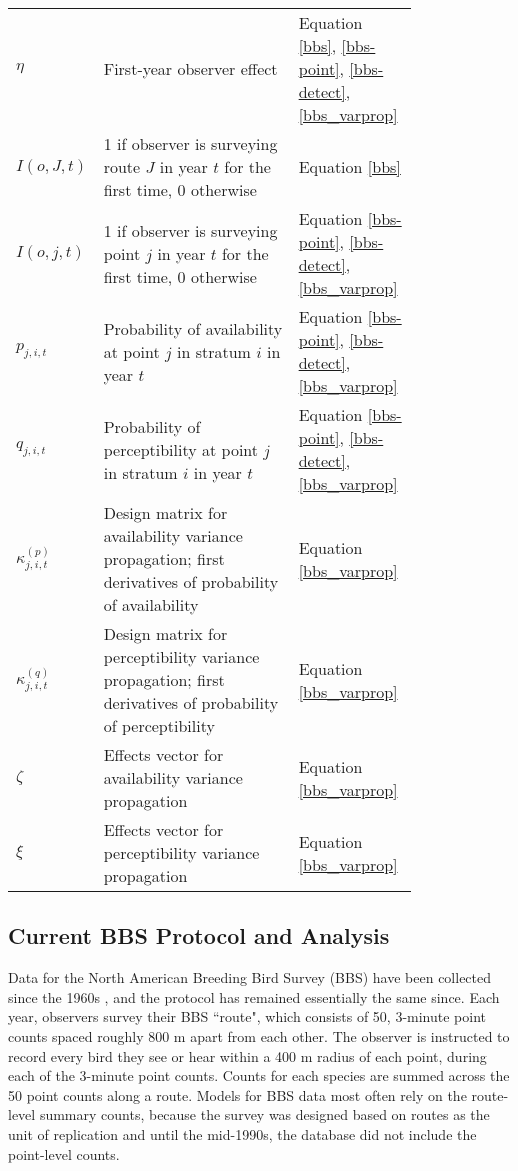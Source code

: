 \documentclass[12pt]{article}
\begin{document}
\begin{table}[!ht]
\begin{tabular}[t]{l>{\raggedright}p{0.5\linewidth}>{\raggedright\arraybackslash}p{0.3\linewidth}}
		$\eta$&First-year observer effect&Equation \ref{bbs}, \ref{bbs-point}, \ref{bbs-detect}, \ref{bbs_varprop}\\
		$I(o,J,t)$&1 if observer is surveying route $J$ in year $t$ for the first time, 0 otherwise&Equation \ref{bbs}\\
		$I(o,j,t)$&1 if observer is surveying point $j$ in year $t$ for the first time, 0 otherwise&Equation \ref{bbs-point}, \ref{bbs-detect}, \ref{bbs_varprop}\\
		$p_{j,i,t}$&Probability of availability at point $j$ in stratum $i$ in year $t$&Equation \ref{bbs-point}, \ref{bbs-detect}, \ref{bbs_varprop}\\
		$q_{j,i,t}$&Probability of perceptibility at point $j$ in stratum $i$ in year $t$&Equation \ref{bbs-point}, \ref{bbs-detect}, \ref{bbs_varprop}\\
		$\kappa_{j,i,t}^{(p)}$&Design matrix for availability variance propagation; first derivatives of probability of availability \citep{bravington_variance_2021}&Equation \ref{bbs_varprop}\\
		$\kappa_{j,i,t}^{(q)}$&Design matrix for perceptibility variance propagation; first derivatives of probability of perceptibility \citep{bravington_variance_2021}&Equation \ref{bbs_varprop}\\
		$\zeta$&Effects vector for availability variance propagation \citep{bravington_variance_2021}&Equation \ref{bbs_varprop}\\
		$\xi$&Effects vector for perceptibility variance propagation \citep{bravington_variance_2021}&Equation \ref{bbs_varprop}\\
		\hline
	\end{tabular}
\end{table}%

\subsection{Current BBS Protocol and Analysis}\label{current-bbs}

\par Data for the North American Breeding Bird Survey (BBS) have been collected since the 1960s \citep{hudson_role_2017, sauer_first_2017}, and the protocol has remained essentially the same since. 
Each year, observers survey their BBS ``route", which consists of 50, 3-minute point counts spaced roughly 800 m apart from each other. 
The observer is instructed to record every bird they see or hear within a 400 m radius of each point, during each of the 3-minute point counts. 
Counts for each species are summed across the 50 point counts along a route.
Models for BBS data most often rely on the route-level summary counts, because the survey was designed based on routes as the unit of replication and until the mid-1990s, the database did not include the point-level counts.
\end{document}
